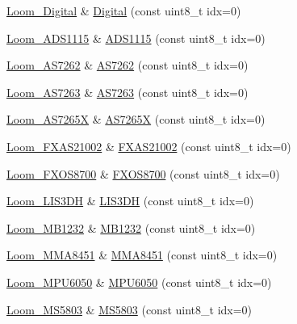 \begin{DoxyCompactItemize}
\item 
\hyperlink{class_loom___digital}{Loom\+\_\+\+Digital} \& \hyperlink{class_loom_manager_ad2d0b7ac9986d5d1d7ba31bb6dc7e096}{Digital} (const uint8\+\_\+t idx=0)
\item 
\hyperlink{class_loom___a_d_s1115}{Loom\+\_\+\+A\+D\+S1115} \& \hyperlink{class_loom_manager_a8a259936dacb423e41abc6e5c0ddc386}{A\+D\+S1115} (const uint8\+\_\+t idx=0)
\item 
\hyperlink{class_loom___a_s7262}{Loom\+\_\+\+A\+S7262} \& \hyperlink{class_loom_manager_ab43299769d25ad470ab0a1af78c5cb9b}{A\+S7262} (const uint8\+\_\+t idx=0)
\item 
\hyperlink{class_loom___a_s7263}{Loom\+\_\+\+A\+S7263} \& \hyperlink{class_loom_manager_aacd2f14847285df52cb1c96bedb1199a}{A\+S7263} (const uint8\+\_\+t idx=0)
\item 
\hyperlink{class_loom___a_s7265_x}{Loom\+\_\+\+A\+S7265X} \& \hyperlink{class_loom_manager_ab7eb247db4db85bed3233c97bc9a72ed}{A\+S7265X} (const uint8\+\_\+t idx=0)
\item 
\hyperlink{class_loom___f_x_a_s21002}{Loom\+\_\+\+F\+X\+A\+S21002} \& \hyperlink{class_loom_manager_a551b150bea409c70c39302a03953058b}{F\+X\+A\+S21002} (const uint8\+\_\+t idx=0)
\item 
\hyperlink{class_loom___f_x_o_s8700}{Loom\+\_\+\+F\+X\+O\+S8700} \& \hyperlink{class_loom_manager_a479be8eb27c108ff4a515e9e6f20b17a}{F\+X\+O\+S8700} (const uint8\+\_\+t idx=0)
\item 
\hyperlink{class_loom___l_i_s3_d_h}{Loom\+\_\+\+L\+I\+S3\+DH} \& \hyperlink{class_loom_manager_aec4f445bac4549bfacf1e605726a4811}{L\+I\+S3\+DH} (const uint8\+\_\+t idx=0)
\item 
\hyperlink{class_loom___m_b1232}{Loom\+\_\+\+M\+B1232} \& \hyperlink{class_loom_manager_aa547d240f6e43d8db10e260afe981351}{M\+B1232} (const uint8\+\_\+t idx=0)
\item 
\hyperlink{class_loom___m_m_a8451}{Loom\+\_\+\+M\+M\+A8451} \& \hyperlink{class_loom_manager_a22e8ddf9132d55c2d4b91e824ce8a2e6}{M\+M\+A8451} (const uint8\+\_\+t idx=0)
\item 
\hyperlink{class_loom___m_p_u6050}{Loom\+\_\+\+M\+P\+U6050} \& \hyperlink{class_loom_manager_a8ac3c59cd01edc6c26e204eef8fb8ef5}{M\+P\+U6050} (const uint8\+\_\+t idx=0)
\item 
\hyperlink{class_loom___m_s5803}{Loom\+\_\+\+M\+S5803} \& \hyperlink{class_loom_manager_a49f9c27af1f59622a97dd0d968384bc5}{M\+S5803} (const uint8\+\_\+t idx=0)
\item 

\end{DoxyCompactItemize}
